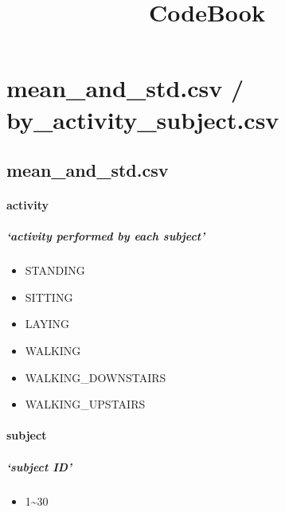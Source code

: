 \documentclass[
]{article}
\title{CodeBook}
\author{}
\date{\vspace{-2.5em}}
\providecommand{\tightlist}{%
  \setlength{\itemsep}{0pt}\setlength{\parskip}{0pt}}
\begin{document}
\maketitle

\hypertarget{mean_and_std.csv-by_activity_subject.csv}{%
\section{mean\_and\_std.csv /
by\_activity\_subject.csv}\label{mean_and_std.csv-by_activity_subject.csv}}

\hypertarget{mean_and_std.csv}{%
\subsection{\texorpdfstring{mean\_and\_std.csv}{mean\_and\_std.csv  }}\label{mean_and_std.csv}}

\hypertarget{activity}{%
\paragraph{activity}\label{activity}}

\hypertarget{activity-performed-by-each-subject}{%
\subparagraph{`activity performed by each
subject'}\label{activity-performed-by-each-subject}}

\begin{itemize}
\tightlist
\item
  STANDING\\
\item
  SITTING\\
\item
  LAYING\\
\item
  WALKING\\
\item
  WALKING\_DOWNSTAIRS\\
\item
  WALKING\_UPSTAIRS
\end{itemize}

\hypertarget{subject}{%
\paragraph{subject}\label{subject}}

\hypertarget{subject-id}{%
\subparagraph{`subject ID'}\label{subject-id}}

\begin{itemize}
\tightlist
\item
  1\textasciitilde30
\end{itemize}
\end{document}
